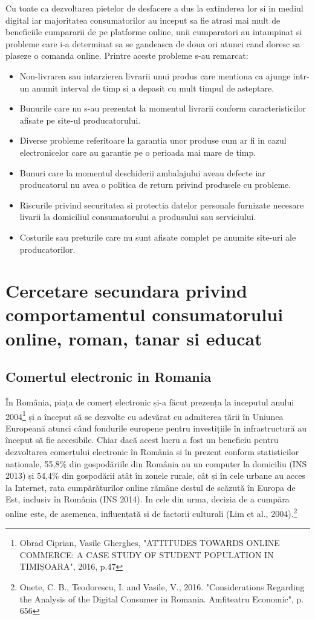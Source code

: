 \documentclass[a4paper, 12pt]{article}
\begin{document}
		\quad\quad Cu toate ca dezvoltarea pietelor de desfacere a dus la extinderea lor si in mediul digital iar majoritatea consumatorilor au inceput sa fie atrasi mai mult de beneficiile cumpararii de pe platforme online, unii cumparatori au intampinat si probleme care i-a determinat sa se gandeasca de doua ori atunci cand doresc sa plaseze o comanda online. Printre aceste probleme s-au remarcat: 
		\begin{itemize}
			\renewcommand{\labelitemi}{$\Rightarrow$}
			\item Non-livrarea sau intarzierea livrarii unui produs care mentiona ca ajunge intr-un anumit interval de timp si a depasit cu mult timpul de asteptare. 
			\item Bunurile care nu s-au prezentat la momentul livrarii conform caracteristicilor afisate pe site-ul producatorului.
			\item Diverse probleme referitoare la garantia unor produse cum ar fi in cazul electronicelor care au garantie pe o perioada mai mare de timp.
			\item  Bunuri care la momentul deschiderii ambalajului aveau defecte iar producatorul nu avea o politica de return privind produsele cu probleme.
			\item Riscurile privind securitatea si protectia datelor personale furnizate necesare livarii la domiciliul consumatorului a produsului sau serviciului.
			\item Costurile sau preturile care nu sunt afisate complet pe anumite site-uri ale producatorilor.
		\end{itemize}
	\newpage
\section{Cercetare secundara privind comportamentul consumatorului online, roman, tanar si educat}
	\subsection{Comertul electronic in Romania}
	\qquad  În România, piața de comerț electronic și-a făcut prezența la inceputul anului 2004\footnote{Obrad Ciprian, Vasile Gherghes, "ATTITUDES TOWARDS ONLINE COMMERCE: A CASE STUDY OF STUDENT POPULATION IN TIMIȘOARA", 2016, p.47} și a început să se dezvolte cu adevărat cu admiterea țării în Uniunea Europeană atunci când fondurile europene pentru investițiile în infrastructură au început să fie accesibile. Chiar dacă acest lucru a fost un beneficiu pentru dezvoltarea comerțului electronic în România și în prezent conform statisticilor naționale, 55,8\% din gospodăriile din România au un computer la domiciliu (INS 2013) și 54,4\% din gospodării atât în zonele rurale, cât și în cele urbane au acces la Internet, rata cumpărăturilor online rămâne destul de scăzută în Europa de Est, inclusiv în România (INS 2014). In cele din urma, decizia de a cumpăra online este, de asemenea, influențată si de factorii culturali (Lim et al., 2004).\footnote{Onete, C. B., Teodorescu, I. and Vasile, V., 2016. "Considerations Regarding the Analysis of the Digital Consumer in Romania. Amfiteatru Economic", p. 656}
	
\end{document}
